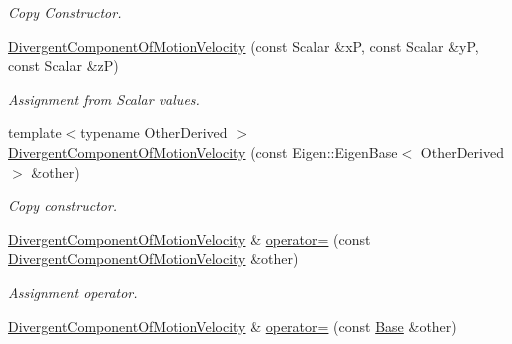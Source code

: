 \begin{DoxyCompactItemize}
\begin{DoxyCompactList}\small\item\em Copy Constructor. \end{DoxyCompactList}\item 
\hyperlink{classow__core_1_1DivergentComponentOfMotionVelocity_abc2e424ff1c1afd3b04d63539a439288}{Divergent\+Component\+Of\+Motion\+Velocity} (const Scalar \&xP, const Scalar \&yP, const Scalar \&zP)\hypertarget{classow__core_1_1DivergentComponentOfMotionVelocity_abc2e424ff1c1afd3b04d63539a439288}{}\label{classow__core_1_1DivergentComponentOfMotionVelocity_abc2e424ff1c1afd3b04d63539a439288}

\begin{DoxyCompactList}\small\item\em Assignment from Scalar values. \end{DoxyCompactList}\item 
{\footnotesize template$<$typename Other\+Derived $>$ }\\\hyperlink{classow__core_1_1DivergentComponentOfMotionVelocity_adedaa6300be05539c24fd67a1f6944e0}{Divergent\+Component\+Of\+Motion\+Velocity} (const Eigen\+::\+Eigen\+Base$<$ Other\+Derived $>$ \&other)
\begin{DoxyCompactList}\small\item\em Copy constructor. \end{DoxyCompactList}\item 
\hyperlink{classow__core_1_1DivergentComponentOfMotionVelocity}{Divergent\+Component\+Of\+Motion\+Velocity} \& \hyperlink{classow__core_1_1DivergentComponentOfMotionVelocity_a8b0cdce85abba477a72ce9129f9f56ba}{operator=} (const \hyperlink{classow__core_1_1DivergentComponentOfMotionVelocity}{Divergent\+Component\+Of\+Motion\+Velocity} \&other)\hypertarget{classow__core_1_1DivergentComponentOfMotionVelocity_a8b0cdce85abba477a72ce9129f9f56ba}{}\label{classow__core_1_1DivergentComponentOfMotionVelocity_a8b0cdce85abba477a72ce9129f9f56ba}

\begin{DoxyCompactList}\small\item\em Assignment operator. \end{DoxyCompactList}\item 
\hyperlink{classow__core_1_1DivergentComponentOfMotionVelocity}{Divergent\+Component\+Of\+Motion\+Velocity} \& \hyperlink{classow__core_1_1DivergentComponentOfMotionVelocity_af5b780bada2624790038f6fe8e94f272}{operator=} (const \hyperlink{classow__core_1_1LinearVelocity}{Base} \&other)\hypertarget{classow__core_1_1DivergentComponentOfMotionVelocity_af5b780bada2624790038f6fe8e94f272}{}\label{classow__core_1_1DivergentComponentOfMotionVelocity_af5b780bada2624790038f6fe8e94f272}


\end{DoxyCompactItemize}
